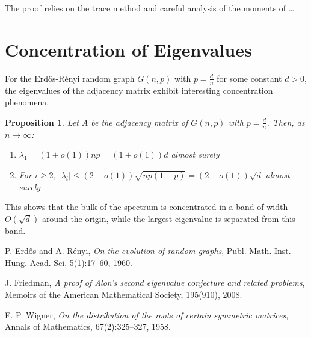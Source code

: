 \documentclass[12pt,a4paper]{article}
\newtheorem{proposition}[theorem]{Proposition}
\begin{document}
The proof relies on the trace method and careful analysis of the moments of \dots

\section{Concentration of Eigenvalues}
For the Erdős-Rényi random graph $G(n,p)$ with $p = \frac{d}{n}$ for some constant $d > 0$, the eigenvalues of the adjacency matrix exhibit interesting concentration phenomena.

\begin{proposition}
Let $A$ be the adjacency matrix of $G(n,p)$ with $p = \frac{d}{n}$. Then, as $n \to \infty$:
\begin{enumerate}
\item $\lambda_1 = (1+o(1))np = (1+o(1))d$ almost surely
\item For $i \ge 2$, $|\lambda_i| \leq (2+o(1))\sqrt{np(1-p)} = (2+o(1))\sqrt{d}$ almost surely
\end{enumerate}
\end{proposition}

This shows that the bulk of the spectrum is concentrated in a band of width $O(\sqrt{d})$ around the origin, while the largest eigenvalue is separated from this band.




\begin{thebibliography}{9}
P. Erdős and A. Rényi,
\textit{On the evolution of random graphs},
Publ. Math. Inst. Hung. Acad. Sci, 5(1):17--60, 1960.

J. Friedman,
\textit{A proof of Alon's second eigenvalue conjecture and related problems},
Memoirs of the American Mathematical Society, 195(910), 2008.

E. P. Wigner,
\textit{On the distribution of the roots of certain symmetric matrices},
Annals of Mathematics, 67(2):325--327, 1958.


\end{thebibliography}
\end{document}
